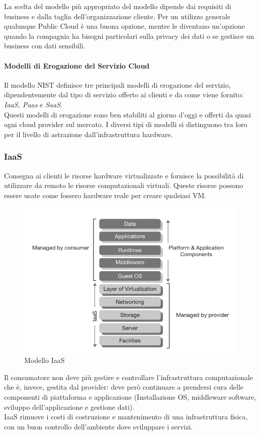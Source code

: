 \documentclass{article}
\begin{document}
La scelta del modello più appropriato del modello dipende dai requisiti di business e dalla taglia dell’organizzazione cliente. Per un utilizzo generale qualunque Public Cloud è una buona opzione, mentre le diventano un’opzione quando la compagnia ha bisogni particolari sulla privacy dei dati o se gestisce un business con dati sensibili.

\paragraph{Modelli di Erogazione del Servizio Cloud}
Il modello NIST definisce tre principali modelli di erogazione del servizio, dipendentemente dal tipo di servizio offerto ai clienti e da come viene fornito: \textit{IaaS, Paas} e \textit{SaaS}.\\
Questi modelli di erogazione sono ben stabiliti al giorno d’oggi e offerti da quasi ogni cloud provider sul mercato. I diversi tipi di modelli si distinguono tra loro per il livello di astrazione dall’infrastruttura hardware.

\subsubsection{IaaS}
Consegna ai clienti le risorse hardware virtualizzate e fornisce la possibilità di utilizzare da remoto le risorse computazionali virtuali. Queste risorse possono essere usate come fossero hardware reale per creare qualsiasi VM.

\begin{figure}[H]
    \centering
    \includegraphics[scale=0.5]{img/iaas.png}
    \caption{Modello IaaS}
\end{figure}
\noindent
Il consumatore non deve più gestire e controllare l’infrastruttura computazionale che è, invece, gestita dal provider: deve però continuare a prendersi cura delle componenti di piattaforma e applicazione (Installazione OS, middleware software, sviluppo dell’applicazione e gestione dati).\\
IaaS rimuove i costi di costruzione e mantenimento di una infrastruttura fisica, con un buon controllo dell’ambiente dove sviluppare i servizi.
\end{document}
